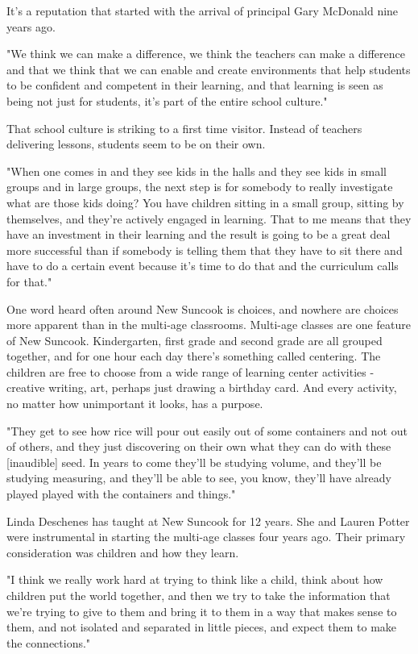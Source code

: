 It's a reputation that started with the arrival of principal Gary McDonald nine years ago.

"We think we can make a difference, we think the teachers can make a difference and that we think that we can enable and create environments that help students to be confident and competent in their learning, and that learning is seen as being not just for students, it's part of the entire school culture."

That school culture is striking to a first time visitor. Instead of teachers delivering lessons, students seem to be on their own.

"When one comes in and they see kids in the halls and they see kids in small groups and in large groups, the next step is for somebody to really investigate what are those kids doing? You have children sitting in a small group, sitting by themselves, and they're actively engaged in learning. That to me means that they have an investment in their learning and the result is going to be a great deal more successful than if somebody is telling them that they have to sit there and have to do a certain event because it's time to do that and the curriculum calls for that."

One word heard often around New Suncook is choices, and nowhere are choices more apparent than in the multi-age classrooms. Multi-age classes are one feature of New Suncook. Kindergarten, first grade and second grade are all grouped together, and for one hour each day there's something called centering. The children are free to choose from a wide range of learning center activities - creative writing, art, perhaps just drawing a birthday card. And every activity, no matter how unimportant it looks, has a purpose.

"They get to see how rice will pour out easily out of some containers and not out of others, and they just discovering on their own what they can do with these [inaudible] seed. In years to come they'll be studying volume, and they'll be studying measuring, and they'll be able to see, you know, they'll have already played played with the containers and things."

Linda Deschenes has taught at New Suncook for 12 years. She and Lauren Potter were instrumental in starting the multi-age classes four years ago. Their primary consideration was children and how they learn.

"I think we really work hard at trying to think like a child, think about how children put the world together, and then we try to take the information that we're trying to give to them and bring it to them in a way that makes sense to them, and not isolated and separated in little pieces, and expect them to make the connections."

